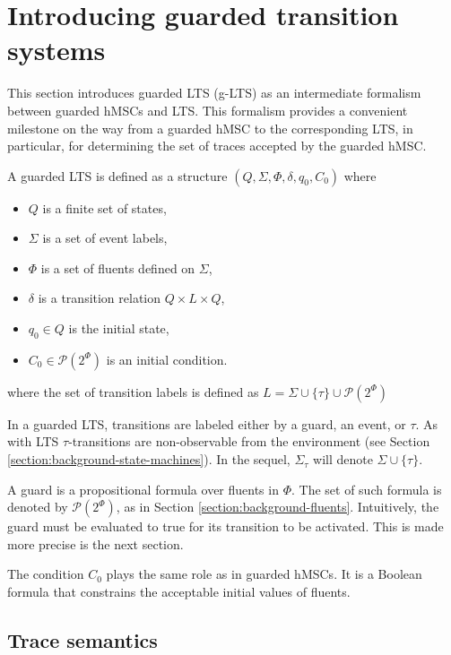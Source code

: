 \section{Introducing guarded transition systems\label{section:deductive-glts}}

This section introduces guarded LTS (g-LTS) as an intermediate formalism between guarded hMSCs and LTS. This formalism provides a convenient milestone on the way from a guarded hMSC to the corresponding LTS, in particular, for determining the set of traces accepted by the guarded hMSC. 

\begin{definition}
\noindent A guarded LTS is defined as a structure $(Q,\Sigma,\Phi,\delta,q_{0},C_{0})$ where 
\begin{itemize}
\item $Q$ is a finite set of states,
\item $\Sigma$ is a set of event labels, 
\item $\Phi$ is a set of fluents defined on $\Sigma$,
\item $\delta$ is a transition relation $Q \times L \times Q$,
\item $q_{0} \in Q$ is the initial state,
\item $C_{0} \in \mathcal{P}(2^\Phi)$ is an initial condition. 
\end{itemize}
where the set of transition labels is defined as $L = \Sigma \cup \{\tau\} \cup \mathcal{P}(2^\Phi)$ 
\end{definition}

In a guarded LTS, transitions are labeled either by a guard, an event, or $\tau$. As with LTS $\tau$-transitions are non-observable from the environment (see Section \ref{section:background-state-machines}). In the sequel, $\Sigma_{\tau}$ will denote $\Sigma \cup \{\tau\}$.

A guard is a propositional formula over fluents in $\Phi$. The set of such formula is denoted by $\mathcal{P}(2^\Phi)$, as in Section \ref{section:background-fluents}. Intuitively, the guard must be evaluated to true for its transition to be activated. This is made more precise is the next section.

The condition $C_0$ plays the same role as in guarded hMSCs. It is a Boolean formula that constrains the acceptable initial values of fluents. 

\subsection{Trace semantics\label{subsection:glts-trace-semantics}} 

